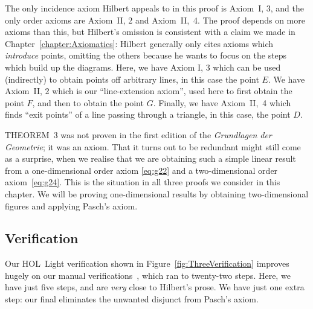 The only incidence axiom Hilbert appeals to in this proof is Axiom~I, 3, and the only order axioms are Axiom~II, 2 and Axiom~II,~4. The proof depends on more axioms than this, but Hilbert's omission is consistent with a claim we made in Chapter~\ref{chapter:Axiomatics}: Hilbert generally only cites axioms which \emph{introduce} points, omitting the others because he wants to focus on the steps which build up the diagrams. Here, we have Axiom I, 3 which can be used (indirectly) to obtain points off arbitrary lines, in this case the point $E$. We have Axiom~II, 2 which is our ``line-extension axiom'', used here to first obtain the point $F$, and then to obtain the point $G$. Finally, we have Axiom~II,~4 which finds ``exit points'' of a line passing through a triangle, in this case, the point $D$.

THEOREM~3 was not proven in the first edition of the \emph{Grundlagen der Geometrie}; it was an axiom. That it turns out to be redundant might still come as a surprise, when we realise that we are obtaining such a simple linear result from a one-dimensional order axiom \eqref{eq:g22} and a two-dimensional order axiom~\eqref{eq:g24}. This is the situation in all three proofs we consider in this chapter. We will be proving one-dimensional results by obtaining two-dimensional figures and applying Pasch's axiom.

\subsection{Verification}
Our HOL~Light verification shown in Figure~\ref{fig:ThreeVerification} improves hugely on our manual verifications~\cite{ScottMScThesis}, which ran to twenty-two steps. Here, we have just five steps, and are \emph{very} close to Hilbert's prose. We have just one extra step: our final  eliminates the unwanted disjunct from Pasch's axiom. 

